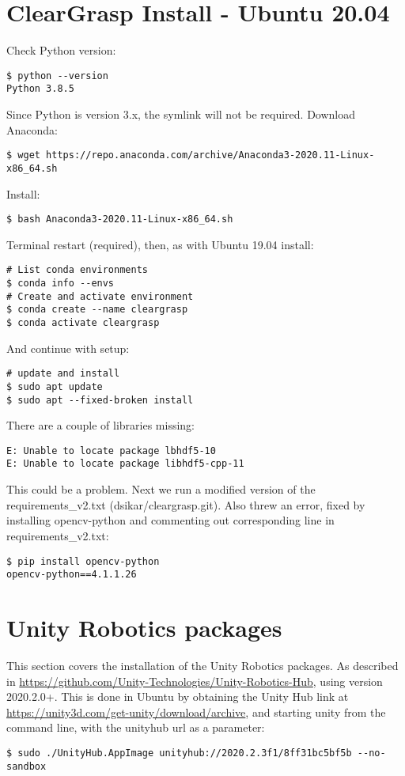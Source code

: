\section{ClearGrasp Install - Ubuntu 20.04}

Check Python version:
\begin{verbatim}
$ python --version
Python 3.8.5    
\end{verbatim}
Since Python is version 3.x, the symlink will not be required. Download Anaconda:
\begin{verbatim}
$ wget https://repo.anaconda.com/archive/Anaconda3-2020.11-Linux-x86_64.sh    
\end{verbatim}
Install:
\begin{verbatim}
$ bash Anaconda3-2020.11-Linux-x86_64.sh    
\end{verbatim}
Terminal restart (required), then, as with Ubuntu 19.04 install:
\begin{verbatim}
# List conda environments
$ conda info --envs
# Create and activate environment
$ conda create --name cleargrasp
$ conda activate cleargrasp
\end{verbatim}
And continue with setup:
\begin{verbatim}
# update and install
$ sudo apt update
$ sudo apt --fixed-broken install
\end{verbatim}
There are a couple of libraries missing:
\begin{verbatim}
E: Unable to locate package lbhdf5-10
E: Unable to locate package libhdf5-cpp-11
\end{verbatim}
This could be a problem. Next we run a modified version of the requirements\_v2.txt (dsikar/cleargrasp.git). Also threw an error, fixed by installing opencv-python and commenting out corresponding line in requirements\_v2.txt:
\begin{verbatim}
$ pip install opencv-python
opencv-python==4.1.1.26

\end{verbatim}

\section{Unity Robotics packages}

This section covers the installation of the Unity Robotics packages. As described in \url{https://github.com/Unity-Technologies/Unity-Robotics-Hub}, using version 2020.2.0+. This is done in Ubuntu by obtaining the Unity Hub link at \url{https://unity3d.com/get-unity/download/archive}, and starting unity from the command line, with the unityhub url as a parameter:
\begin{verbatim}
$ sudo ./UnityHub.AppImage unityhub://2020.2.3f1/8ff31bc5bf5b --no-sandbox 
\end{verbatim}

